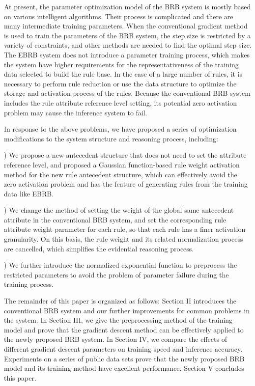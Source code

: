 \documentclass{ieeeaccess}
\begin{document}
At present, the parameter optimization model of the BRB system is mostly based on various intelligent algorithms. Their process is
complicated and there are many intermediate training parameters. When the conventional gradient method is used to train the parameters
of the BRB system, the step size is restricted by a variety of constraints, and other methods are needed to find the optimal step size.
The EBRB system does not introduce a parameter training process, which makes the system have higher requirements for the representativeness
of the training data selected to build the rule base. In the case of a large number of rules, it is necessary to perform rule reduction or
use the data structure to optimize the storage and activation process of the rules. Because the conventional BRB system includes the rule attribute
reference level setting, its potential zero activation problem may cause the inference system to fail.

In response to the above problems, we have proposed a series of optimization modifications to the system structure and reasoning process, including:

) We propose a new antecedent structure that does not need to set the attribute reference level, and proposed a Gaussian function-based
rule weight activation method for the new rule antecedent structure, which can effectively avoid the zero activation problem and has the feature of
generating rules from the training data like EBRB.

) We change the method of setting the weight of the global same antecedent attribute in the
conventional BRB system, and set the corresponding rule attribute weight parameter for each rule, so that each rule has a finer activation granularity.
On this basis, the rule weight and its related normalization process are cancelled, which simplifies the evidential reasoning process.

) We further introduce the normalized exponential function to preprocess the restricted parameters to avoid the problem of
parameter failure during the training process.

The remainder of this paper is organized as follows: Section II introduces the conventional BRB system and our further improvements for common problems in the system.
In Section III, we give the preprocessing method of the training model and prove that the gradient descent method can be effectively applied to the newly proposed BRB system.
In Section IV, we compare the effects of different gradient descent parameters on training speed and inference accuracy. Experiments on a series of public data sets prove that
the newly proposed BRB model and its training method have excellent performance. Section V concludes this paper.
\end{document}
